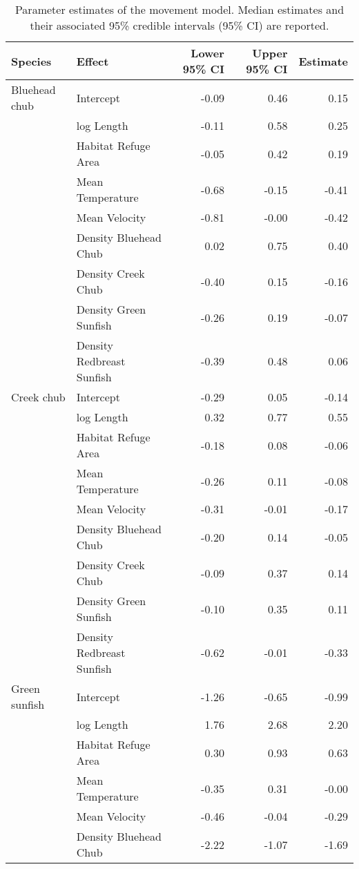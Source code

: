 \begin{table}[ht]
\centering
\caption{Parameter estimates of the movement model. Median estimates and their associated 95\% credible intervals (95\% CI) are reported.} 
\label{tab:coefficients}
\begin{tabular}{llrrr}
  \hline
Species & Effect & Lower 95\% CI & Upper 95\% CI & Estimate \\ 
  \hline
Bluehead chub & Intercept & -0.09 & 0.46 & 0.15 \\ 
   & log Length & -0.11 & 0.58 & 0.25 \\ 
   & Habitat Refuge Area & -0.05 & 0.42 & 0.19 \\ 
   & Mean Temperature & -0.68 & -0.15 & -0.41 \\ 
   & Mean Velocity & -0.81 & -0.00 & -0.42 \\ 
   & Density Bluehead Chub & 0.02 & 0.75 & 0.40 \\ 
   & Density Creek Chub & -0.40 & 0.15 & -0.16 \\ 
   & Density Green Sunfish & -0.26 & 0.19 & -0.07 \\ 
   & Density Redbreast Sunfish & -0.39 & 0.48 & 0.06 \\ 
  Creek chub & Intercept & -0.29 & 0.05 & -0.14 \\ 
   & log Length & 0.32 & 0.77 & 0.55 \\ 
   & Habitat Refuge Area & -0.18 & 0.08 & -0.06 \\ 
   & Mean Temperature & -0.26 & 0.11 & -0.08 \\ 
   & Mean Velocity & -0.31 & -0.01 & -0.17 \\ 
   & Density Bluehead Chub & -0.20 & 0.14 & -0.05 \\ 
   & Density Creek Chub & -0.09 & 0.37 & 0.14 \\ 
   & Density Green Sunfish & -0.10 & 0.35 & 0.11 \\ 
   & Density Redbreast Sunfish & -0.62 & -0.01 & -0.33 \\ 
  Green sunfish & Intercept & -1.26 & -0.65 & -0.99 \\ 
   & log Length & 1.76 & 2.68 & 2.20 \\ 
   & Habitat Refuge Area & 0.30 & 0.93 & 0.63 \\ 
   & Mean Temperature & -0.35 & 0.31 & -0.00 \\ 
   & Mean Velocity & -0.46 & -0.04 & -0.29 \\ 
   & Density Bluehead Chub & -2.22 & -1.07 & -1.69 \\ 

\end{tabular}
\end{table}
